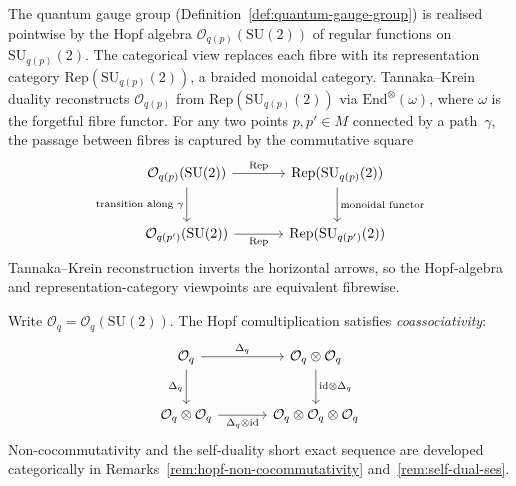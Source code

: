 
\begin{remark}
\label{rem:quantum-gauge-group-category}
The quantum gauge group
(Definition~\ref{def:quantum-gauge-group}) is realised pointwise by
the Hopf algebra $\mathcal{O}_{q(p)}(\mathrm{SU}(2))$ of regular
functions on $\mathrm{SU}_{q(p)}(2)$.  The categorical view replaces
each fibre with its representation category
$\mathrm{Rep}(\mathrm{SU}_{q(p)}(2))$, a braided monoidal category.
Tannaka--Krein duality reconstructs $\mathcal{O}_{q(p)}$ from
$\mathrm{Rep}(\mathrm{SU}_{q(p)}(2))$ via
$\mathrm{End}^{\otimes}(\omega)$, where $\omega$ is the forgetful
fibre functor.  For any two points $p, p' \in M$ connected by a
path~$\gamma$, the passage between fibres is captured by the
commutative square
\begin{equation}\label{eq:tannaka-krein-functoriality}
\begin{tikzcd}[row sep=2.5em, column sep=3.5em]
  \mathcal{O}_{q(p)}(\mathrm{SU}(2))
    \ar[r, "\mathrm{Rep}"]
    \ar[d, "\text{transition along } \gamma"']
  & \mathrm{Rep}(\mathrm{SU}_{q(p)}(2))
    \ar[d, "\text{monoidal functor}"]
  \\
  \mathcal{O}_{q(p')}(\mathrm{SU}(2))
    \ar[r, "\mathrm{Rep}"']
  & \mathrm{Rep}(\mathrm{SU}_{q(p')}(2))
\end{tikzcd}
\end{equation}
Tannaka--Krein reconstruction inverts the horizontal arrows, so the
Hopf-algebra and representation-category viewpoints are equivalent
fibrewise.
\end{remark}

\begin{remark}
\label{rem:hopf-structure-diagrams}
Write $\mathcal{O}_q = \mathcal{O}_q(\mathrm{SU}(2))$.
The Hopf comultiplication satisfies \emph{coassociativity}:
\begin{equation}\label{eq:coassociativity}
\begin{tikzcd}[row sep=2.5em, column sep=3.5em]
  \mathcal{O}_q
    \ar[r, "\Delta_q"]
    \ar[d, "\Delta_q"']
  & \mathcal{O}_q \otimes \mathcal{O}_q
    \ar[d, "\mathrm{id} \otimes \Delta_q"]
  \\
  \mathcal{O}_q \otimes \mathcal{O}_q
    \ar[r, "\Delta_q \otimes \mathrm{id}"']
  & \mathcal{O}_q \otimes \mathcal{O}_q \otimes \mathcal{O}_q
\end{tikzcd}
\end{equation}
Non-cocommutativity and the self-duality short exact sequence are
developed categorically in
Remarks~\ref{rem:hopf-non-cocommutativity}
and~\ref{rem:self-dual-ses}.
\end{remark}

